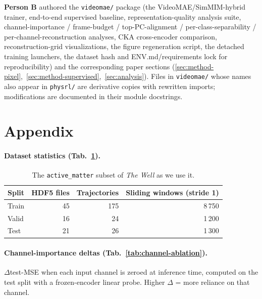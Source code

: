 \documentclass{article}
\begin{document}
\textbf{Person B} authored the \texttt{videomae/} package (the
VideoMAE/SimMIM-hybrid trainer, end-to-end supervised baseline,
representation-quality analysis suite, channel-importance / frame-budget /
top-PC-alignment / per-class-separability / per-channel-reconstruction
analyses, CKA cross-encoder comparison, reconstruction-grid visualizations,
the figure regeneration script, the detached training launchers, the
dataset hash and ENV.md/requirements lock for reproducibility) and the
corresponding paper sections
(\ref{sec:method-pixel},~\ref{sec:method-supervised},~\ref{sec:analysis}).
Files in \texttt{videomae/} whose names also appear in \texttt{physrl/} are
derivative copies with rewritten imports; modifications are documented in their
module docstrings.

\section*{Appendix}

\paragraph{Dataset statistics (Tab.~\ref{tab:dataset}).}
\begin{table}[h]
\centering
\caption{The \texttt{active\_matter} subset of \emph{The Well} \citep{ohana2025well} as we use it.}
\label{tab:dataset}
\small
\begin{tabular}{lrrr}
\toprule
\textbf{Split} & \textbf{HDF5 files} & \textbf{Trajectories} & \textbf{Sliding windows (stride 1)} \\
\midrule
Train & 45 & 175 & 8\,750 \\
Valid & 16 &  24 & 1\,200 \\
Test  & 21 &  26 & 1\,300 \\
\bottomrule
\end{tabular}
\end{table}

\paragraph{Channel-importance deltas (Tab.~\ref{tab:channel-ablation}).}
$\Delta$test-MSE when each input channel is zeroed at inference time, computed
on the test split with a frozen-encoder linear probe. Higher $\Delta$ = more
reliance on that channel.
\end{document}
